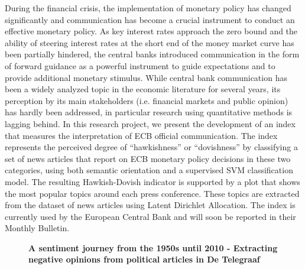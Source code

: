 \documentclass[10pt, a4paper, twopage, headinclude, footinclude, BCOR5mm]{scrartcl}
\begin{document}
\noindent
During the financial crisis, the implementation of monetary policy has changed significantly and communication has become a crucial instrument to conduct an effective monetary policy. As key interest rates approach the zero bound and the ability of steering interest rates at the short end of the money market curve has been partially hindered, the central banks introduced communication in the form of forward guidance as a powerful instrument to guide expectations and to provide additional monetary stimulus.  While central bank communication has been a widely analyzed topic in the economic literature for several years, its perception by its main stakeholders (i.e. financial markets and public opinion) has hardly been addressed, in particular research using quantitative methods is lagging behind. In this research project, we present the development of an index that measures the interpretation of ECB official communication. The index represents the perceived degree of “hawkishness” or “dovishness”  by classifying a set of news articles that report on ECB monetary policy decisions in these two categories, using both semantic orientation and a supervised SVM classification model. The resulting Hawkish-Dovish indicator is supported by a plot that shows the most popular topics around each press conference. These topics are extracted from the dataset of news articles using Latent Dirichlet Allocation. The index is currently used by the European Central Bank and will soon be reported in their Monthly Bulletin.


\newpage

\begin{figure}[t!]
\centering
\large\textbf{A sentiment journey from the 1950s until 2010 - Extracting negative opinions from political articles in De Telegraaf}
\vspace*{0.5cm}
\end{figure}
\end{document}
